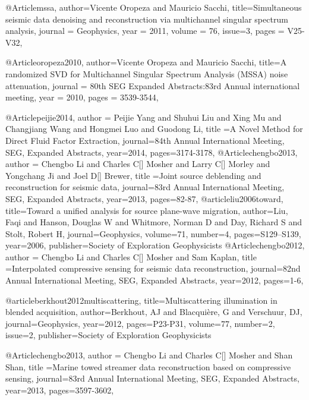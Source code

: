 @Article{mssa,
  author={Vicente Oropeza and Mauricio Sacchi},
  title={Simultaneous seismic data denoising and reconstruction via multichannel singular spectrum analysis},
  journal = 	 {Geophysics},
  year = 	 2011,
  volume =	 76,
    issue=3,
  pages =	 {V25-V32},
}



@Article{oropeza2010,
  author={Vicente Oropeza and Mauricio Sacchi},
  title={A randomized SVD for Multichannel Singular Spectrum Analysis (MSSA) noise attenuation},
  journal = 	 {80th SEG Expanded Abstracts:83rd Annual international meeting},
  year = 	 2010,
  pages =	 {3539-3544},
}


@Article{peijie2014,
  author = {Peijie Yang and Shuhui Liu and Xing Mu and Changjiang Wang and Hongmei Luo and Guodong Li},
  title ={A Novel Method for Direct Fluid Factor Extraction},
  journal={84th Annual International Meeting, SEG, Expanded Abstracts},
  year=2014,
  pages={3174-3178},
}
@Article{chengbo2013,
  author = {Chengbo Li and Charles C[] Mosher and Larry C[] Morley and Yongchang Ji and Joel D[] Brewer},
  title ={Joint source deblending and reconstruction for seismic data},
  journal={83rd Annual International Meeting, SEG, Expanded Abstracts},
  year=2013,
  pages={82-87},
}
@article{liu2006toward,
  title={Toward a unified analysis for source plane-wave migration},
  author={Liu, Faqi and Hanson, Douglas W and Whitmore, Norman D and Day, Richard S and Stolt, Robert H},
  journal={Geophysics},
  volume={71},
  number={4},
  pages={S129--S139},
  year={2006},
  publisher={Society of Exploration Geophysicists}
}
@Article{chengbo2012,
  author = {Chengbo Li and Charles C[] Mosher and Sam Kaplan},
  title ={Interpolated compressive sensing for seismic data reconstruction},
  journal={82nd Annual International Meeting, SEG, Expanded Abstracts},
  year=2012,
  pages={1-6},
}

@article{berkhout2012multiscattering,
  title={Multiscattering illumination in blended acquisition},
  author={Berkhout, AJ and Blacqui{\`e}re, G and Verschuur, DJ},
  journal={Geophysics},
  year={2012},
  pages={P23-P31},
  volume=77,
  number=2,
  issue=2,
  publisher={Society of Exploration Geophysicists}
}

@Article{chengbo2013,
  author = {Chengbo Li and Charles C[] Mosher and Shan Shan},
  title ={Marine towed streamer data reconstruction based on compressive sensing},
  journal={83rd Annual International Meeting, SEG, Expanded Abstracts},
  year=2013,
  pages={3597-3602},
}

